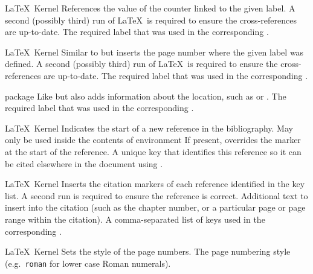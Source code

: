 %
 {}%
 {\LaTeX\ Kernel}%
 {References the value of the counter linked to the given label.
  A second (possibly third) run of \LaTeX\ is required to ensure the cross-references
  are up-to-date.
 }%
 {%
   \BeginArgList
     The required label that was used in the
     corresponding .
   \EndArgList
 }

%
 {}%
 {\LaTeX\ Kernel}%
 {Similar to  but inserts the page number where the given
  label was defined.
  A second (possibly third) run of \LaTeX\ is required to ensure the cross-references
  are up-to-date.
 }%
 {%
   \BeginArgList
     The required label that was used in the
     corresponding .
   \EndArgList
 }

%
 {}%
 { package}%
 {Like  but also adds information about the location, such
  as  or .
 }%
 {%
   \BeginArgList
     The required label that was used in the
     corresponding .
   \EndArgList
 }

%
 {}%
 {\LaTeX\ Kernel}%
 {Indicates the start of a new reference in the bibliography. May
  only be used inside the contents of  environment}%
 {%
   \BeginArgList
     If present, overrides the marker at the
    start of the reference.
     A unique key that identifies this reference so
    it can be cited elsewhere in the document using .
   \EndArgList
 }

%
 {}%
 {\LaTeX\ Kernel}%
 {Inserts the citation markers of each reference identified in the
  key list. A second run is required to ensure the reference is
  correct.}%
 {%
    \BeginArgList
       Additional text to insert into the citation
       (such as the chapter number, or a particular page or
       page range within the citation).
       A comma-separated list of keys used in
      the corresponding .
    \EndArgList
 }

%
 {}%
 {\LaTeX\ Kernel}%
 {Sets the style of the page numbers.}%
 {%
   \BeginArgList
      The page numbering style (e.g.\
      \texttt{roman} for lower case Roman numerals).
   \EndArgList
 }

